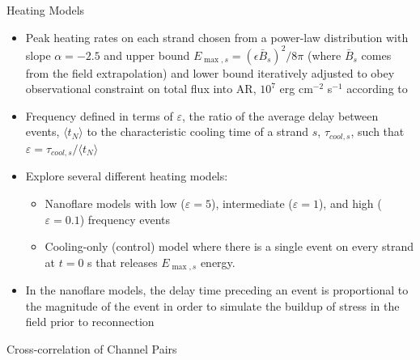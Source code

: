 \documentclass[final]{beamer}
\begin{document}
\begin{frame}
\begin{columns}[T]
\begin{column}{0.49\linewidth}
\begin{block}{Heating Models}
\begin{itemize}
            \item Peak heating rates on each strand chosen from a power-law distribution with slope $\alpha=-2.5$ and upper bound $E_{\max,s}=(\epsilon \bar{B}_s)^2/8\pi$ (where $\bar{B}_s$ comes from the field extrapolation) and lower bound iteratively adjusted to obey observational constraint on total flux into AR, $10^7$ erg cm$^{-2}$ s$^{-1}$ according to \citet{withbroe_mass_1977}
            \item Frequency defined in terms of $\varepsilon$, the ratio of the average delay between events, $\langle t_N\rangle$ to the characteristic cooling time of a strand $s$, $\tau_{cool,s}$, such that $\varepsilon = \tau_{cool,s}/\langle t_N\rangle$
            \item Explore several different heating models:
            \begin{itemize}
                \item Nanoflare models with low ($\varepsilon=5$), intermediate ($\varepsilon=1$), and high ($\varepsilon=0.1$) frequency events
                \item Cooling-only (control) model where there is a single event on every strand at $t=0$ s that releases $E_{\max,s}$ energy.
            \end{itemize}
            \item In the nanoflare models, the delay time preceding an event is proportional to the magnitude of the event in order to simulate the buildup of stress in the field prior to reconnection \citep[e.g. see][]{cargill_active_2014,barnes_inference_2016-1}
        \end{itemize}
        \vspace{-1ex}
    \end{block}
    \begin{block}{Cross-correlation of Channel Pairs}
        \begin{columns}[c]
            \begin{column}{0.49\columnwidth}
            \begin{figure}
\end{figure}
\end{column}
\end{columns}
\end{block}
\end{column}
\end{columns}
\end{frame}
\end{document}
